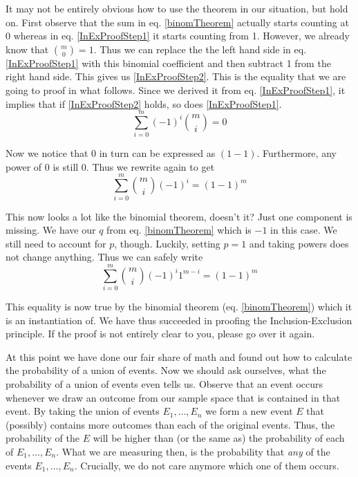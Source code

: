 \documentclass[a4paper,11pt,leqno]{report}
\begin{document}
It may not be entirely obvious how to use the theorem in our situation, but hold on. First observe
that the sum in eq. \ref{binomTheorem} actually starts counting at 0 whereas in eq. \ref{InExProofStep1}
it starts counting from 1. However, we already know that $ \binom{m}{0} = 1 $. Thus we can replace the
the left hand side in eq. \ref{InExProofStep1} with this binomial coefficient and then subtract 1 from the
right hand side. This gives us \ref{InExProofStep2}. This is the equality that we are going to proof
in what follows. Since we derived it from eq. \ref{InExProofStep1}, it implies that if \ref{InExProofStep2}
holds, so does \ref{InExProofStep1}.
\begin{equation} \label{InExProofStep2}
\underset{i=0}{\overset{m}{\sum}}(-1)^{i}\binom{m}{i} = 0
\end{equation} 

Now we notice that $ 0 $ in turn can be expressed as $ (1-1) $. Furthermore, any power of 0 is still 0.
Thus we rewrite again to get
\begin{equation}
\underset{i=0}{\overset{m}{\sum}}\binom{m}{i}(-1)^{i} = (1-1)^{m}
\end{equation}

This now looks a lot like the binomial theorem, doesn't it? Just one component is missing. We have
our $ q $ from eq. \ref{binomTheorem} which is $ -1 $ in this case. We still need to account for 
$ p $, though. Luckily, setting $ p=1 $ and taking powers does not change anything. Thus we can safely write
\begin{equation}
\underset{i=0}{\overset{m}{\sum}}\binom{m}{i}(-1)^{i}1^{m-i} = (1-1)^{m}
\end{equation} 

This equality is now true by the binomial theorem (eq. \ref{binomTheorem}) which it is an instantiation of.
We have thus succeeded in proofing the Inclusion-Exclusion principle. If the proof is not entirely
clear to you, please go over it again.

At this point we have done our fair share of math and found out how to calculate the probability of a union
of events. Now we should ask ourselves, what the probability of a union of events even tells us. Observe that an event 
occurs whenever we draw an outcome from our sample space that is contained in that event. By taking the union
of events $ E_{1}, \ldots, E_{n} $ we form a new event $ E $ that (possibly) contains more outcomes than each 
of the original events. Thus, the probability of the $ E $ will be higher than (or the same as) the 
probability of each of $ E_{1}, \ldots, E_{n} $. What we are measuring then, is the probability that 
\textit{any} of the events $ E_{1}, \ldots, E_{n} $. Crucially, we do not care anymore which one of them
occurs.
\end{document}
